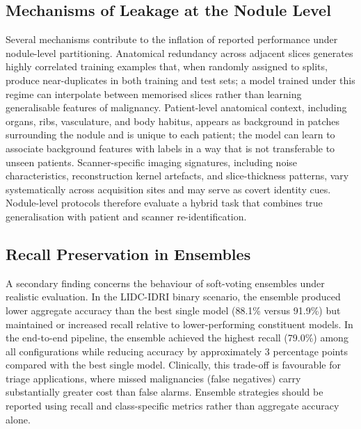 \documentclass{ieeeaccess}
\begin{document}
\subsection{Mechanisms of Leakage at the Nodule Level}
Several mechanisms contribute to the inflation of reported performance under nodule-level partitioning. Anatomical redundancy across adjacent slices generates highly correlated training examples that, when randomly assigned to splits, produce near-duplicates in both training and test sets; a model trained under this regime can interpolate between memorised slices rather than learning generalisable features of malignancy. Patient-level anatomical context, including organs, ribs, vasculature, and body habitus, appears as background in patches surrounding the nodule and is unique to each patient; the model can learn to associate background features with labels in a way that is not transferable to unseen patients. Scanner-specific imaging signatures, including noise characteristics, reconstruction kernel artefacts, and slice-thickness patterns, vary systematically across acquisition sites and may serve as covert identity cues. Nodule-level protocols therefore evaluate a hybrid task that combines true generalisation with patient and scanner re-identification.

\subsection{Recall Preservation in Ensembles}
A secondary finding concerns the behaviour of soft-voting ensembles under realistic evaluation. In the LIDC-IDRI binary scenario, the ensemble produced lower aggregate accuracy than the best single model (88.1\% versus 91.9\%) but maintained or increased recall relative to lower-performing constituent models. In the end-to-end pipeline, the ensemble achieved the highest recall (79.0\%) among all configurations while reducing accuracy by approximately 3 percentage points compared with the best single model. Clinically, this trade-off is favourable for triage applications, where missed malignancies (false negatives) carry substantially greater cost than false alarms. Ensemble strategies should be reported using recall and class-specific metrics rather than aggregate accuracy alone.
\end{document}

